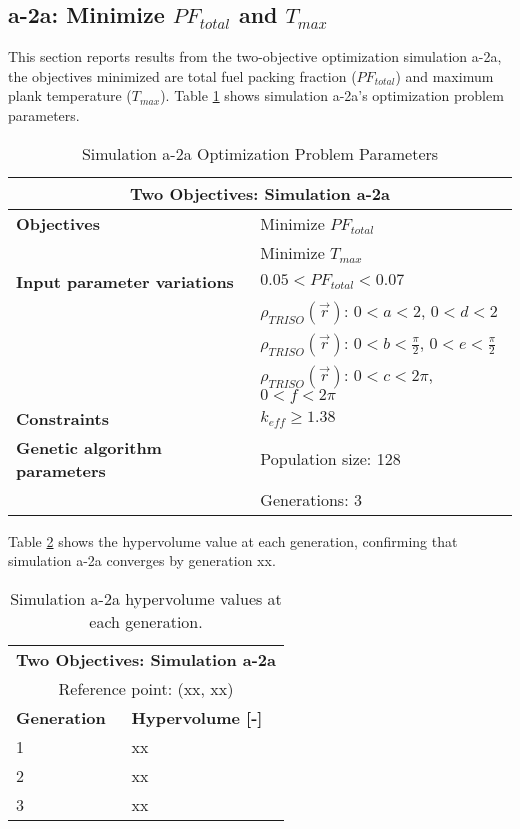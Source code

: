 \subsection{a-2a: Minimize $PF_{total}$ and $T_{max}$}
\label{sec:a-2a}
This section reports results from the two-objective optimization simulation a-2a, the 
objectives minimized are total fuel packing fraction ($PF_{total}$) and maximum plank
temperature ($T_{max}$).  
Table \ref{tab:simulationa2a} shows simulation a-2a's optimization problem parameters. 
\begin{table}[htbp!]
    \centering
    \onehalfspacing
    \caption{Simulation a-2a Optimization Problem Parameters}
	\label{tab:simulationa2a}
    \footnotesize
    \begin{tabular}{l|p{5.3cm}}
    \hline 
    \multicolumn{2}{c}{\textbf{Two Objectives: Simulation a-2a}} \\
    \hline 
    \textbf{Objectives} & Minimize $PF_{total}$ \\
    & Minimize $T_{max}$ \\
    \hline 
    \textbf{Input parameter variations} & $0.05<PF_{total}<0.07$ \\
    & $\rho_{TRISO}(\vec{r})$: $0<a<2$, $0<d<2$\\
    & $\rho_{TRISO}(\vec{r})$: $0<b<\frac{\pi}{2}$, $0<e<\frac{\pi}{2}$\\
    & $\rho_{TRISO}(\vec{r})$: $0<c<2\pi$, $0<f<2\pi$\\
    \hline
    \textbf{Constraints} & $k_{eff} \geq 1.38$\\ 
    \hline 
    \textbf{Genetic algorithm parameters} & Population size: 128 \\
    & Generations: 3 \\
    \hline
    \end{tabular}
\end{table}

Table \ref{tab:a2a-hypervolume} shows the hypervolume value at each generation, 
confirming that simulation a-2a converges by generation xx. 
\begin{table}[htbp!]
    \centering
    \onehalfspacing
    \caption{Simulation a-2a hypervolume values at each generation.}
	\label{tab:a2a-hypervolume}
    \footnotesize
    \begin{tabular}{ll}
    \hline 
    \multicolumn{2}{c}{\textbf{Two Objectives: Simulation a-2a}} \\
    \multicolumn{2}{c}{Reference point: (xx, xx)} \\
    \hline 
    \textbf{Generation} & \textbf{Hypervolume [-]} \\
    \hline
    1 & xx \\
    2 & xx \\
    3 & xx \\
    \hline
    \end{tabular}
\end{table}


